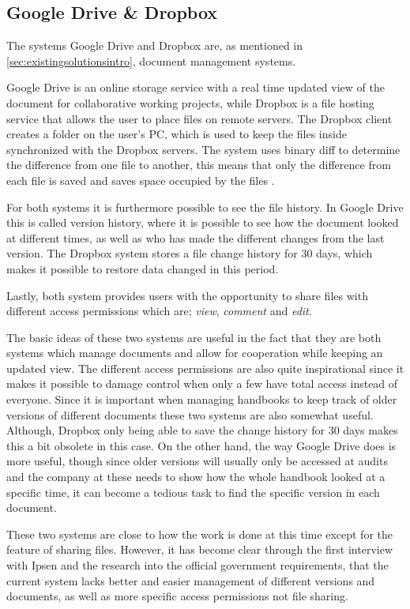 \subsection{Google Drive \& Dropbox}\label{sec:DropDrive}
The systems Google Drive and Dropbox are, as mentioned in \cref{sec:existingsolutionsintro}, document management systems.

Google Drive is an online storage service with a real time updated view of the document for collaborative working projects, while Dropbox is a file hosting service that allows the user to place files on remote servers.
The Dropbox client creates a folder on the user's PC, which is used to keep the files inside synchronized with the Dropbox servers. 
The system uses binary diff to determine the difference from one file to another, this means that only the difference from each file is saved and saves space occupied by the files \cite{DropboxDiff}.

For both systems it is furthermore possible to see the file history.
In Google Drive this is called version history, where it is possible to see how the document looked at different times, as well as who has made the different changes from the last version.
The Dropbox system stores a file change history for 30 days, which makes it possible to restore data changed in this period.

Lastly, both system provides users with the opportunity to share files with different access permissions which are; \textit{view}, \textit{comment} and \textit{edit}.

The basic ideas of these two systems are useful in the fact that they are both systems which manage documents and allow for cooperation while keeping an updated view.
The different access permissions are also quite inspirational since it makes it possible to damage control when only a few have total access instead of everyone.
Since it is important when managing handbooks to keep track of older versions of different documents these two systems are also somewhat useful.
Although, Dropbox only being able to save the change history for 30 days makes this a bit obsolete in this case.
On the other hand, the way Google Drive does is more useful, though since older versions will usually only be accessed at audits and the company at these needs to show how the whole handbook looked at a specific time, it can become a tedious task to find the specific version in each document.

These two systems are close to how the work is done at this time except for the feature of sharing files.
However, it has become clear through the first interview with Ipsen and the research into the official government requirements, that the current system lacks better and easier management of different versions and documents, as well as more specific access permissions not file sharing.
